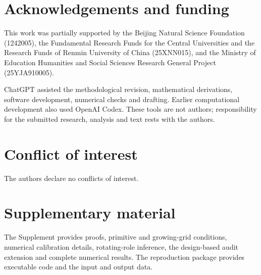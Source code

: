 \section*{Acknowledgements and funding}
This work was partially supported by the Beijing Natural Science Foundation (1242005), the Fundamental Research Funds for the Central Universities and the Research Funds of Renmin University of China (25XNN015), and the Ministry of Education Humanities and Social Sciences Research General Project (25YJA910005).

ChatGPT assisted the methodological revision, mathematical derivations, software development, numerical checks and drafting. Earlier computational development also used OpenAI Codex. These tools are not authors; responsibility for the submitted research, analysis and text rests with the authors.

\section*{Conflict of interest}
The authors declare no conflicts of interest.

\section*{Supplementary material}
The Supplement provides proofs, primitive and growing-grid conditions, numerical calibration details, rotating-role inference, the design-based audit extension and complete numerical results. The reproduction package provides executable code and the input and output data.

